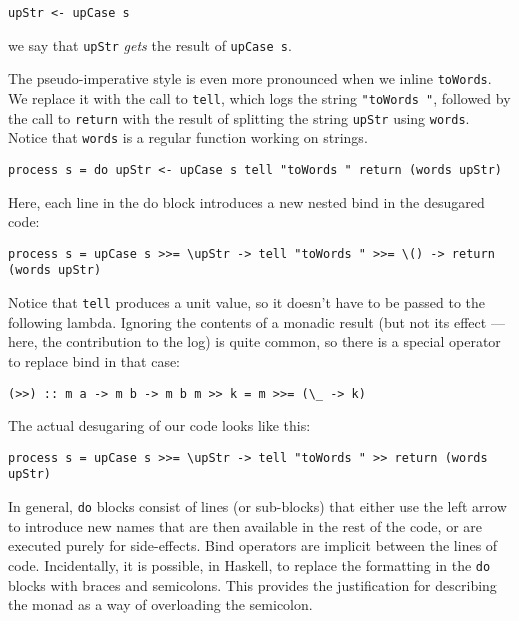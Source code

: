 \begin{verbatim}
upStr <- upCase s
\end{verbatim}

we say that \texttt{upStr} \emph{gets} the result of \texttt{upCase\ s}.

The pseudo-imperative style is even more pronounced when we inline
\texttt{toWords}. We replace it with the call to \texttt{tell}, which
logs the string \texttt{"toWords\ "}, followed by the call to
\texttt{return} with the result of splitting the string \texttt{upStr}
using \texttt{words}. Notice that \texttt{words} is a regular function
working on strings.

\begin{verbatim}
process s = do upStr <- upCase s tell "toWords " return (words upStr)
\end{verbatim}

Here, each line in the do block introduces a new nested bind in the
desugared code:

\begin{verbatim}
process s = upCase s >>= \upStr -> tell "toWords " >>= \() -> return (words upStr)
\end{verbatim}

Notice that \texttt{tell} produces a unit value, so it doesn't have to
be passed to the following lambda. Ignoring the contents of a monadic
result (but not its effect --- here, the contribution to the log) is
quite common, so there is a special operator to replace bind in that
case:

\begin{verbatim}
(>>) :: m a -> m b -> m b m >> k = m >>= (\_ -> k)
\end{verbatim}

The actual desugaring of our code looks like this:

\begin{verbatim}
process s = upCase s >>= \upStr -> tell "toWords " >> return (words upStr)
\end{verbatim}

In general, \texttt{do} blocks consist of lines (or sub-blocks) that
either use the left arrow to introduce new names that are then available
in the rest of the code, or are executed purely for side-effects. Bind
operators are implicit between the lines of code. Incidentally, it is
possible, in Haskell, to replace the formatting in the \texttt{do}
blocks with braces and semicolons. This provides the justification for
describing the monad as a way of overloading the semicolon.

